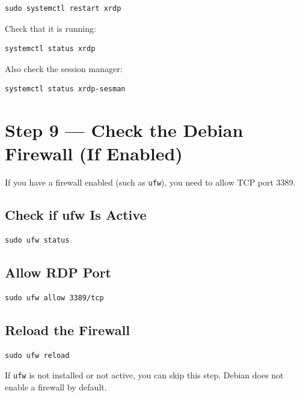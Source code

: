 \documentclass[a4paper,12pt]{article}
\newcommand{\code}[1]{\texttt{\small #1}}
\begin{document}
\begin{lstlisting}[style=bashstyle]
sudo systemctl restart xrdp
\end{lstlisting}

Check that it is running:

\begin{lstlisting}[style=bashstyle]
systemctl status xrdp
\end{lstlisting}

Also check the session manager:

\begin{lstlisting}[style=bashstyle]
systemctl status xrdp-sesman
\end{lstlisting}

\section{Step 9 --- Check the Debian Firewall (If Enabled)}

If you have a firewall enabled (such as \code{ufw}), you need to allow TCP port 3389.

\subsection{Check if ufw Is Active}

\begin{lstlisting}[style=bashstyle]
sudo ufw status
\end{lstlisting}

\subsection{Allow RDP Port}

\begin{lstlisting}[style=bashstyle]
sudo ufw allow 3389/tcp
\end{lstlisting}

\subsection{Reload the Firewall}

\begin{lstlisting}[style=bashstyle]
sudo ufw reload
\end{lstlisting}

\begin{notebox}
If \code{ufw} is not installed or not active, you can skip this step. Debian does not enable a firewall by default.
\end{notebox}
\end{document}
